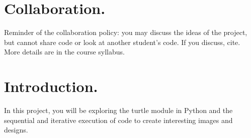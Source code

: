 \documentclass[11pt, letterpaper, onecolumn, oneside, final]{article}
\begin{document}
    \maketitle


    \section{Collaboration.} Reminder of the collaboration policy: you may discuss the ideas of the project, but cannot share code or look at another student’s code. If you discuss, cite. More details are in the course syllabus.

    \section{Introduction.} In this project, you will be exploring the turtle module in Python and the sequential and iterative execution of code to create interesting images and designs. 
     
\end{document}
